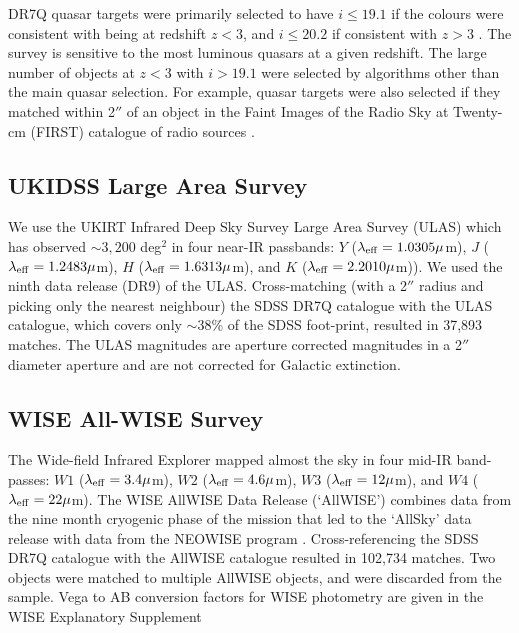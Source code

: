 DR7Q quasar targets were primarily selected to have $i \leq 19.1$ if the colours were consistent with being at redshift $z < 3$, and $i \leq 20.2$ if consistent with $z > 3$ \citep{richards02}. 
The survey is sensitive to the most luminous quasars at a given redshift. 
The large number of objects at $z < 3$ with $i > 19.1$ were selected by algorithms other than the main quasar selection. 
For example, quasar targets were also selected if they matched within 2$''$ of an object in the Faint Images of the Radio Sky at Twenty-cm (FIRST) catalogue of radio sources \citep{becker95}. \

\subsection{UKIDSS Large Area Survey}

We use the UKIRT Infrared Deep Sky Survey \citep[UKIDSS;][]{lawrence07} Large Area Survey (ULAS) which has observed $\sim 3,200$ deg$^2$ in four near-IR passbands: $Y$ ($\lambda_{\rm eff} = 1.0305\mu$m), $J$ ($\lambda_{\rm eff} = 1.2483\mu$m), $H$ ($\lambda_{\rm eff} = 1.6313\mu$m), and $K$ ($\lambda_{\rm eff} = 2.2010\mu$m)). 
We used the ninth data release (DR9) of the ULAS. 
Cross-matching (with a 2$''$ radius and picking only the nearest neighbour) the SDSS DR7Q catalogue with the ULAS catalogue, which covers only $\sim 38$\% of the SDSS foot-print, resulted in 37,893 matches. 
The ULAS magnitudes are aperture corrected magnitudes in a 2$''$ diameter aperture and are not corrected for Galactic extinction.

\subsection{WISE All-WISE Survey}

The Wide-field Infrared Explorer \citep[WISE;][]{wright10} mapped almost the sky in four mid-IR band-passes: $W1$ ($\lambda_{\rm eff} = 3.4\mu$m), $W2$ ($\lambda_{\rm eff} = 4.6\mu$m), $W3$ ($\lambda_{\rm eff} = 12\mu$m), and $W4$ ($\lambda_{\rm eff} = 22\mu$m). 
The WISE AllWISE Data Release (`AllWISE') combines data from the nine month cryogenic phase of the mission that led to the `AllSky' data release with data from the NEOWISE program \citep{mainzer11}. 
Cross-referencing the SDSS DR7Q catalogue with the AllWISE catalogue resulted in 102,734 matches. 
Two objects were matched to multiple AllWISE objects, and were discarded from the sample. 
Vega to AB conversion factors for WISE photometry are given in the WISE Explanatory Supplement \citep{cutri13}

